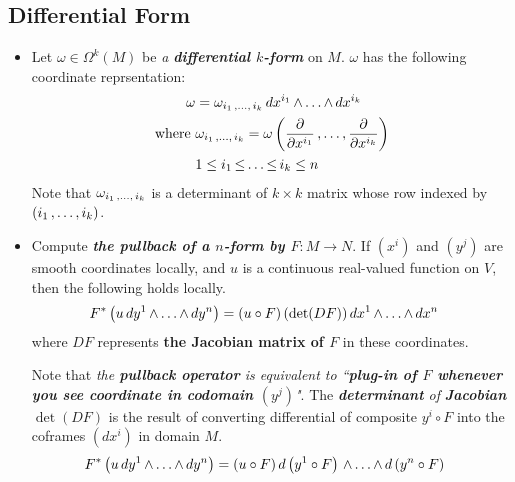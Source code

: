 \documentclass[11pt]{article}
\begin{document}
\subsection{Differential Form}
\begin{itemize}
\item Let $\omega \in \Omega^{k}(M)$ be \emph{a \textbf{differential $k$-form}} on $M$. $\omega$ has the following coordinate reprsentation:
\begin{align}
\omega &=\omega_{i_1 \,{,}\ldots{,}\, i_k}\, dx^{i_1} \,{\wedge}\ldots{\wedge}\, dx^{i_k}  \label{eqn: differential_k_form_coordinate}\\
\text{where }& \omega_{i_1 \,{,}\ldots{,}\, i_k} = \omega\left(\frac{\partial }{ \partial x^{i_1}} \,{,}\ldots{,}\, \frac{\partial }{ \partial x^{i_k}}\right) \label{eqn: differential_k_form_coordinate_component} \\
&1 \le i_1 \,{\le}\ldots{\le}\, i_k \le n \nonumber
\end{align} Note that $\omega_{i_1 \,{,}\ldots{,}\, i_k}$ is a determinant of $k \times k$ matrix whose row indexed by $(i_1 \,{,}\ldots{,}\, i_k)$. 

\item Compute \emph{\textbf{the pullback of a $n$-form by $F: M \rightarrow N$}}. If $(x^i)$ and $(y^j)$ are smooth coordinates locally, and $u$ is a continuous real-valued function on $V$, then the following holds locally.
\begin{align}
F^{*}\left(u\,dy^{1} \,{\wedge}\ldots{\wedge}\, dy^{n}\right) &= (u \circ F)\,(\det(DF))\,dx^{1} \,{\wedge}\ldots{\wedge}\, dx^{n}  \label{eqn: differential_form_pull_back_coordinate_1}
\end{align}
where $DF$ represents \textbf{the Jacobian matrix of $F$} in these coordinates.

Note that \emph{the \textbf{pullback operator} is equivalent to ``\textbf{plug-in of $F$ whenever you see coordinate in codomain $(y^j)$}"}. The \emph{\textbf{determinant} of} \emph{\textbf{Jacobian}} $\det(DF)$ is the result of converting differential of composite $y^i \circ F$ into the coframes $(dx^i)$ in domain $M$.
\begin{align*}
F^{*}\left(u\,dy^{1} \,{\wedge}\ldots{\wedge}\, dy^{n}\right) &= (u \circ F)\, d\left(y^1 \circ F\right) \,{\wedge}\ldots{\wedge}\, d\left(y^n \circ F\right)
\end{align*}




\end{itemize}
\end{document}
